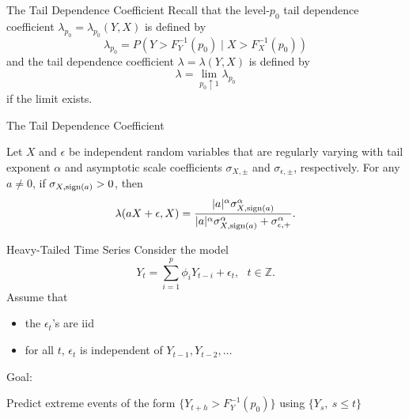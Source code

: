 \documentclass{beamer}
\def\Z{{\mathbb Z}}
\def\sign{{\rm sign}}
\begin{document}

\begin{frame}{The Tail Dependence Coefficient}
    Recall that the level-$p_0$ tail dependence coefficient $\lambda_{p_0} = \lambda_{p_0}(Y, X)$ is defined by
    \[
    \lambda_{p_0} = P(Y > F_Y^{-1}(p_0) \mid X > F_X^{-1}(p_0))
    \]
    and the tail dependence coefficient $\lambda = \lambda(Y, X)$ is defined by
    \[
    \lambda = \lim_{p_0 \uparrow 1} \lambda_{p_0}
    \]
    if the limit exists.
\end{frame}

\begin{frame}{The Tail Dependence Coefficient}
    \begin{lemma}\label{lem:lambda_lem}
        Let $X$ and $\epsilon$ be independent random variables that are regularly varying with tail exponent $\alpha$ and asymptotic scale coefficients $\sigma_{X, \pm}$ and $\sigma_{\epsilon, \pm}$, respectively. For any $a \ne 0$, if $\sigma_{X, \sign(a)} > 0$, then
        \[
        \lambda(a X + \epsilon, X) = \frac{|a|^\alpha \sigma_{X, \sign(a)}^\alpha}{|a|^\alpha \sigma_{X, \sign(a)}^\alpha + \sigma_{\epsilon, +}^\alpha}.
        \]
    \end{lemma}
\end{frame}

\begin{frame}{Heavy-Tailed Time Series}
    Consider the model
    \begin{equation}\label{e:Y_t}
        Y_t  = \sum_{i=1}^{p} \phi_i Y_{t-i} + \epsilon_t,\ \ \ t\in \Z.
    \end{equation}
    Assume that
    \begin{itemize}
        \item the $\epsilon_t$'s are iid
        \item for all $t$, $\epsilon_t$ is independent of $Y_{t - 1}, Y_{t - 2}, \ldots$
    \end{itemize}

    \medskip

    Goal:
    \begin{center}
        Predict extreme events of the form $\{Y_{t + h} > F_Y^{-1}(p_0)\}$ using $\{Y_s, \ s \le t\}$    
    \end{center}
\end{frame}
\end{document}
